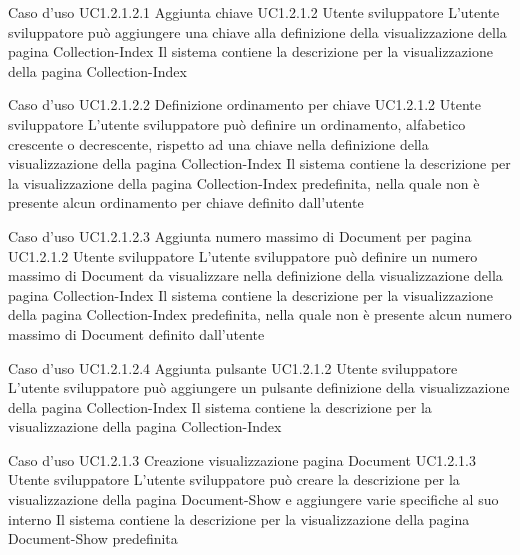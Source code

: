 \UCtitle
{Caso d'uso UC1.2.1.2.1}
{Aggiunta chiave}
\UC
{UC1.2.1.2}
{Utente sviluppatore}
{L'utente sviluppatore  può aggiungere una chiave alla definizione della visualizzazione della pagina Collection-Index}
{Il sistema contiene la descrizione per la visualizzazione della pagina Collection-Index}


\UCtitle
{Caso d'uso UC1.2.1.2.2}
{Definizione ordinamento per chiave}
\UC
{UC1.2.1.2}
{Utente sviluppatore}
{L'utente sviluppatore  può  definire un ordinamento, alfabetico crescente o decrescente, rispetto ad una chiave nella definizione della visualizzazione della pagina Collection-Index}
{Il sistema contiene la descrizione per la visualizzazione della pagina Collection-Index predefinita, nella quale non è presente alcun ordinamento per chiave definito dall'utente}

\UCtitle
{Caso d'uso UC1.2.1.2.3}
{Aggiunta numero massimo di Document per pagina}
\UC
{UC1.2.1.2}
{Utente sviluppatore}
{L'utente sviluppatore  può definire un numero massimo di Document da visualizzare nella definizione della visualizzazione della pagina Collection-Index}
{Il sistema contiene la descrizione per la visualizzazione della pagina Collection-Index predefinita, nella quale non è presente alcun numero massimo di Document definito dall'utente}

\UCtitle
{Caso d'uso UC1.2.1.2.4}
{Aggiunta pulsante}
\UC
{UC1.2.1.2}
{Utente sviluppatore}
{L'utente sviluppatore  può aggiungere un pulsante definizione della visualizzazione della pagina Collection-Index}
{Il sistema contiene la descrizione per la visualizzazione della pagina Collection-Index}


\UCtitle
{Caso d'uso UC1.2.1.3}
{Creazione visualizzazione pagina Document}
\UC
{UC1.2.1.3}
{Utente sviluppatore}
{L'utente sviluppatore  può creare la descrizione per la visualizzazione della pagina Document-Show e aggiungere varie specifiche al suo interno}
{Il sistema contiene la descrizione per la visualizzazione della pagina Document-Show predefinita}

